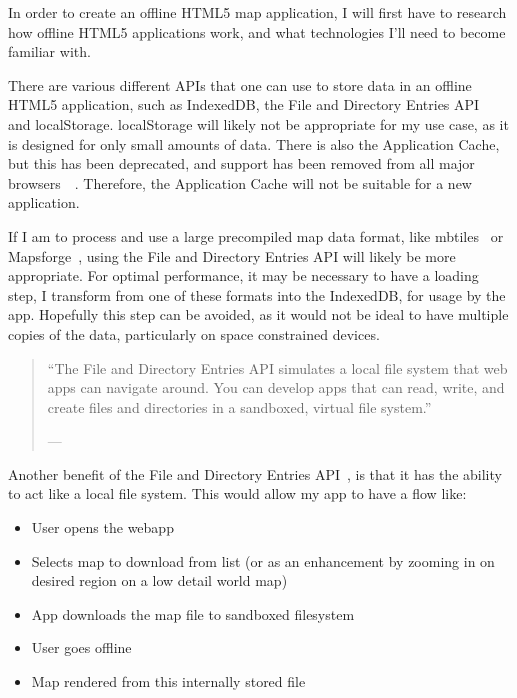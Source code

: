 In order to create an offline HTML5 map application, I will first have to research how offline HTML5 applications work, and what technologies I'll need to become familiar with.

There are various different APIs that one can use to store data in an offline HTML5 application, such as IndexedDB, the File and Directory Entries API~\cite{w3c-file-directories-api}~\cite{mdn-file-directories-api} and localStorage. localStorage will likely not be appropriate for my use case, as it is designed for only small amounts of data. There is also the Application Cache, but this has been deprecated, and support has been removed from all major browsers~\cite{whatwg-application-cache}~\cite{mdn-application-cache}. Therefore, the Application Cache will not be suitable for a new application.

If I am to process and use a large precompiled map data format, like mbtiles~\cite{mbtiles-spec} or Mapsforge~\cite{mapsforge-format}, using the File and Directory Entries API will likely be more appropriate. For optimal performance, it may be necessary to have a loading step, I transform from one of these formats into the IndexedDB, for usage by the app. Hopefully this step can be avoided, as it would not be ideal to have multiple copies of the data, particularly on space constrained devices.

\begin{quote}
    ``The File and Directory Entries API simulates a local file system that web apps can navigate around. You can develop apps that can read, write, and create files and directories in a sandboxed, virtual file system.''
    
    \footnotesize{--- }
\end{quote}

Another benefit of the File and Directory Entries API~\cite{w3c-file-directories-api}, is that it has the ability to act like a local file system. This would allow my app to have a flow like:

\begin{itemize}
    \item User opens the webapp
    \item Selects map to download from list (or as an enhancement by zooming in on desired region on a low detail world map)
    \item App downloads the map file to sandboxed filesystem
    \item User goes offline
    \item Map rendered from this internally stored file
\end{itemize}

